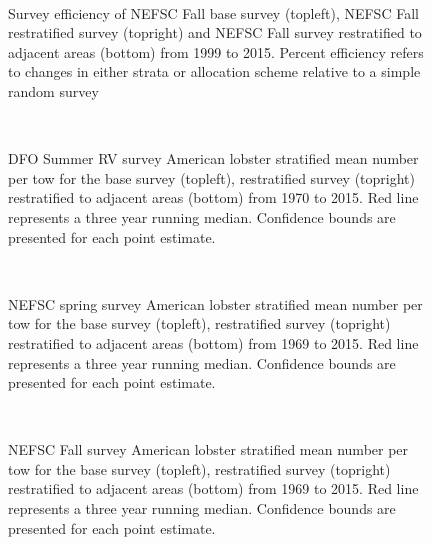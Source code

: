 \documentclass[11pt]{article}
\newcommand{\e}{/backup/bio_data/bio.lobster/figures/} %
\begin{document}
\begin{figure}
\centering
{}
\\
\caption{Survey efficiency of NEFSC Fall base survey (topleft), NEFSC Fall restratified survey (topright) and NEFSC Fall survey restratified to adjacent areas (bottom) from 1999 to 2015. Percent efficiency refers to changes in either strata or allocation scheme relative to a simple random survey }
\end{figure}
\clearpage

\begin{figure}
\centering
{}
\\
\caption{DFO Summer RV survey American lobster stratified mean number per tow for the base survey (topleft), restratified survey (topright) restratified to adjacent areas (bottom) from 1970 to 2015. Red line represents a three year running median. Confidence bounds are presented for each point estimate. }
\end{figure}
\clearpage

\begin{figure}
\centering
{}
\\
\caption{NEFSC spring survey American lobster stratified mean number per tow for the base survey (topleft), restratified survey (topright) restratified to adjacent areas (bottom) from 1969 to 2015. Red line represents a three year running median. Confidence bounds are presented for each point estimate. }
\end{figure}
\clearpage


\begin{figure}
\centering
{}
\\
\caption{NEFSC Fall survey American lobster stratified mean number per tow for the base survey (topleft), restratified survey (topright) restratified to adjacent areas (bottom) from 1969 to 2015. Red line represents a three year running median. Confidence bounds are presented for each point estimate. }
\end{figure}
\clearpage
\end{document}
